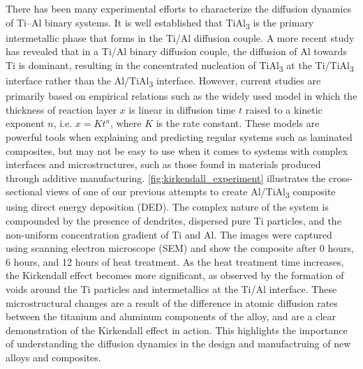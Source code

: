 There has been many experimental efforts to characterize the diffusion dynamics of Ti--Al binary systems. It is well established that TiAl\textsubscript{3} is the primary intermetallic phase that forms in the Ti/Al diffusion couple.\cite{mirjalili2013kinetics,zhang2022formation} A more recent study has revealed that in a Ti/Al binary diffusion couple, the diffusion of Al towards Ti is dominant, resulting in the concentrated nucleation of TiAl\textsubscript{3} at the Ti/TiAl\textsubscript{3} interface rather than the Al/TiAl\textsubscript{3} interface.\cite{thiyaneshwaran2018nucleation} However, current studies are primarily based on empirical relations such as the widely used model in which the thickness of reaction layer $x$ is linear in diffusion time $t$ raised to a kinetic exponent $n$, i.e. $x = Kt^n$, where $K$ is the rate constant.\cite{xu2006growth,mirjalili2013kinetics,zhang2022formation} 
These models are powerful tools when explaining and predicting regular systems such as laminated composites, but may not be easy to use when it comes to systems with complex interfaces and microstructures, such as those found in materials produced through additive manufacturing. 
\cref{fig:kirkendall_experiment} illustrates the cross-sectional views of one of our previous attempts to create Al/TiAl\textsubscript{3} composite using direct energy deposition (DED). The complex nature of the system is compounded by the presence of dendrites, dispersed pure Ti particles, and the non-uniform concentration gradient of Ti and Al. The images were captured using scanning electron microscope (SEM) and show the composite after 0 hours, 6 hours, and 12 hours of heat treatment. As the heat treatment time increases, the Kirkendall effect becomes more significant, as observed by the formation of voids around the Ti particles and intermetallics at the Ti/Al interface. These microstructural changes are a result of the difference in atomic diffusion rates between the titanium and aluminum components of the alloy, and are a clear demonstration of the Kirkendall effect in action. This highlights the importance of understanding the diffusion dynamics in the design and manufactruing of new alloys and composites. 

